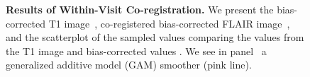 \begin{figure}
\hfill
\hfill
\caption{{\bf Results of Within-Visit Co-registration.}  We present the bias-corrected T1 image~\protect{}, co-registered bias-corrected FLAIR image~\protect{}, and the scatterplot of the sampled values comparing the values from the T1 image and bias-corrected values \protect{}.  We see in panel~\protect{} a generalized additive model (GAM) smoother (pink line).  }
\label{fig:coreg}
\end{figure}


